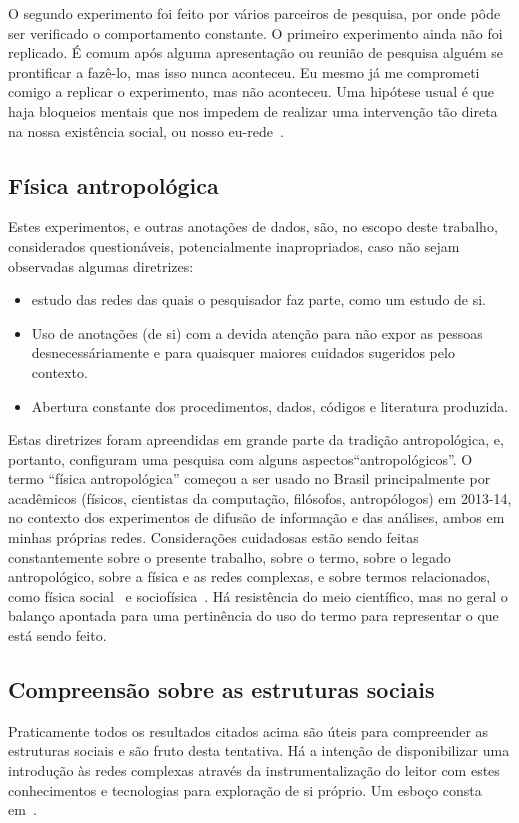 \documentclass[a4paper,openright,12pt]{report} %
\begin{document}
O segundo experimento foi feito por vários parceiros de pesquisa,
por onde pôde ser verificado o comportamento constante.
O primeiro experimento ainda não foi replicado.
É comum após alguma apresentação ou reunião de pesquisa
alguém se prontificar a fazê-lo,
mas isso nunca aconteceu. 
Eu mesmo já me comprometi comigo a replicar o experimento,
mas não aconteceu. Uma hipótese usual é que haja bloqueios
mentais que nos impedem de realizar uma intervenção tão direta
na nossa existência social, ou nosso eu-rede~\cite{latour,ciberiun}.

\subsection{Física antropológica}
Estes experimentos, e outras anotações de dados, são, no escopo deste
trabalho, considerados questionáveis, potencialmente inapropriados,
caso não sejam observadas algumas diretrizes:
\begin{itemize}
	\item estudo das redes das quais o pesquisador faz parte, como um estudo de si.
	\item Uso de anotações (de si) com a devida atenção para não expor as pessoas desnecessáriamente
		e para quaisquer maiores cuidados sugeridos pelo contexto.
	\item Abertura constante dos procedimentos, dados, códigos e literatura produzida.
\end{itemize}

Estas diretrizes foram apreendidas em grande parte da tradição antropológica,
e, portanto, configuram uma pesquisa com alguns aspectos``antropológicos''.
O termo ``física antropológica'' começou a ser usado no Brasil principalmente por
acadêmicos (físicos, cientistas da computação, filósofos, antropólogos) em 2013-14,
no contexto dos experimentos de difusão de informação e das análises, ambos em minhas próprias redes.
Considerações cuidadosas estão sendo feitas constantemente sobre o presente trabalho, 
sobre o termo, sobre o legado antropológico,
sobre a física e as redes complexas, e sobre termos relacionados, 
como física social~\cite{pentland} e sociofísica~\cite{socioF}.
Há resistência do meio científico, mas no geral o balanço apontada para uma pertinência do uso do termo
para representar o que está sendo feito.

\subsection{Compreensão sobre as estruturas sociais}\label{sec:com}
Praticamente todos os resultados citados acima
são úteis para compreender as estruturas sociais e são
fruto desta tentativa.
Há a intenção de disponibilizar uma introdução às redes complexas
através da instrumentalização do leitor com estes conhecimentos e tecnologias
para exploração de si próprio. Um esboço
consta em~\cite{gradus}.
\end{document}
